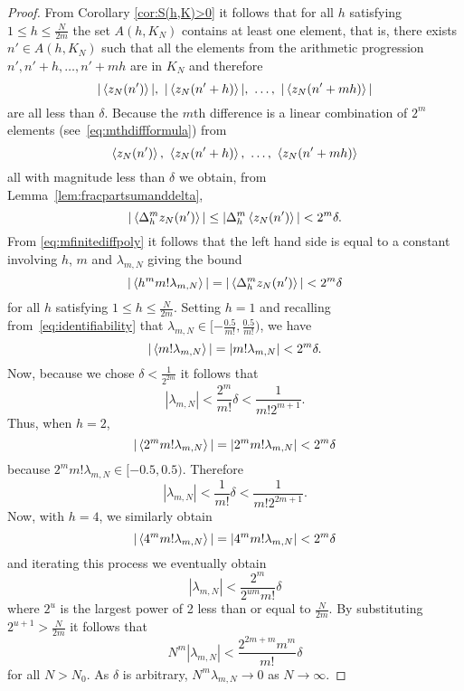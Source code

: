 \documentclass[journal]{IEEEtran}
\begin{document}
\begin{proof}
From Corollary \ref{cor:S(h,K)>0} it follows that for all $h$ satisfying $1\leq h \leq\frac{N}{2m}$ the set $A(h,K_N)$ contains at least one element, that is, there exists $n' \in A(h,K_N)$ such that all the elements from the arithmetic progression $n', n'+h, \dots, n' + mh$ are in $K_N$ and therefore 
\[
\vert \left\langle z_N(n') \right\rangle \vert,\,\, \vert \left\langle z_N(n'+h) \right\rangle \vert, \,\, \dots, \,\, \vert \left\langle z_N(n'+mh) \right\rangle \vert 
\] 
are all less than $\delta$.  Because the $m$th difference is a linear combination of $2^{m}$ elements (see~\eqref{eq:mthdiffformula}) from 
\[
\left\langle z_N(n') \right\rangle, \,\, \left\langle z_N(n'+h) \right\rangle, \,\, \dots, \,\, \left\langle z_N(n'+mh) \right\rangle
\]
all with magnitude less than $\delta$ we obtain, from Lemma~\ref{lem:fracpartsumanddelta},
\begin{equation}\label{eq:Deltazfracbound}
|\left\langle \Delta_h^m z_N(n') \right\rangle| \leq |\Delta_h^m \left\langle  z_N(n') \right\rangle| < 2^{m}\delta.
\end{equation}
From \eqref{eq:mfinitediffpoly} it follows that the left hand side is equal to a constant involving $h$, $m$ and $\lambda_{m,N}$ giving the bound
\begin{equation}\label{eq:startiterativearg}
|\left\langle  h^m m! \lambda_{m,N}  \right\rangle|  = |\left\langle    \Delta_h^m z_N(n')  \right\rangle| < 2^m\delta
\end{equation}
for all $h$ satisfying $1\leq h \leq\frac{N}{2m}$. Setting $h = 1$ and recalling from~\eqref{eq:identifiability} that $\lambda_{m,N} \in [-\tfrac{0.5}{m!}, \tfrac{0.5}{m!})$, we have
 \[
 |\left\langle  m! \lambda_{m,N}  \right\rangle| = | m! \lambda_{m,N} |< 2^m\delta.
 \]
Now, because we chose $\delta < \tfrac{1}{2^{2m}}$ it follows that 
\[
| \lambda_{m,N} |< \frac{2^m}{m!}\delta < \frac{1}{m! 2^{m+1}}.
\]
Thus, when $h = 2$, 
\[
|\left\langle  2^m m! \lambda_{m,N}  \right\rangle| = | 2^m m! \lambda_{m,N} |< 2^m\delta
\]
because $2^m m! \lambda_{m,N} \in [-0.5, 0.5)$. Therefore
\[
| \lambda_{m,N} |< \frac{1}{m!}\delta < \frac{1}{m! 2^{2m+1}}.
\]
Now, with $h = 4$, we similarly obtain 
\[
|\left\langle  4^m m! \lambda_{m,N}  \right\rangle| = | 4^m m! \lambda_{m,N} |< 2^m\delta
\]
and iterating this process we eventually obtain 
\[
| \lambda_{m,N} | < \frac{2^m}{2^{um} m!}\delta
\]
where $2^u$ is the largest power of 2 less than or equal to $\tfrac{N}{2m}$.  %
By substituting $2^{u+1} > \frac{N}{2m}$ it follows that
 \begin{equation}\label{eq:enditerativearg}
 N^m|\lambda_{m,N}| < \frac{2^{2m+m}m^m}{m!}\delta
 \end{equation}
for all $N > N_0$.  As $\delta$ is arbitrary, $N^m \lambda_{m,N} \rightarrow 0$ as $N\rightarrow \infty$.


\end{proof}
\end{document}
